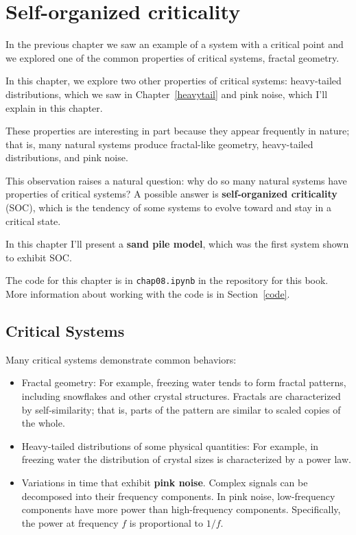 \documentclass[12pt]{book}
\theoremstyle{exercise}
\begin{document}
\chapter{Self-organized criticality}
\label{soc}


In the previous chapter we saw an example of a system with a critical
point and we explored one of the common properties of critical
systems, fractal geometry.

In this chapter, we explore two other properties of critical systems:
heavy-tailed distributions, which we saw in Chapter~\ref{heavytail}
and pink noise, which I'll explain in this chapter.

These properties are interesting in part because they appear
frequently in nature; that is, many natural systems produce 
fractal-like geometry, heavy-tailed distributions, and pink noise.

This observation raises a natural question: why do so many natural
systems have properties of critical systems?  A possible answer is
{\bf self-organized criticality} (SOC), which is the tendency of some
systems to evolve toward and stay in a critical state.

In this chapter I'll present a {\bf sand pile model}, which was the
first system shown to exhibit SOC.

The code for this chapter is in {\tt chap08.ipynb} in the repository
for this book.  More information about working with the code is
in Section~\ref{code}.


\section{Critical Systems}

Many critical systems demonstrate common behaviors:

\begin{itemize}

\item Fractal geometry: For example, freezing water tends to form
  fractal patterns, including snowflakes and other crystal
  structures.  Fractals are characterized by self-similarity; that is,
  parts of the pattern are similar to scaled copies of the whole.


\item Heavy-tailed distributions of some physical quantities: For
  example, in freezing water the distribution of crystal sizes is
  characterized by a power law.


\item Variations in time that exhibit {\bf pink noise}.  Complex
  signals can be decomposed into their frequency components.  In pink
  noise, low-frequency components have more power than high-frequency
  components.  Specifically, the power at frequency $f$ is
  proportional to $1/f$.


\end{itemize}
\end{document}
